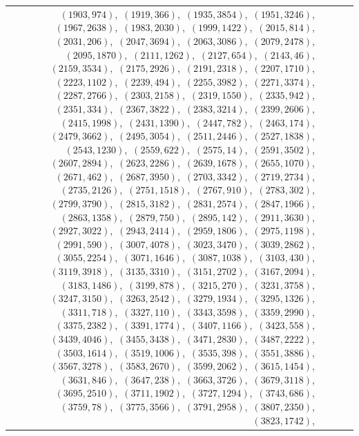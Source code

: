 \documentclass[11pt]{article}
\begin{document}
\begin{longtable}{@{}rrl>{\raggedright\arraybackslash}p{}@{}}
$(1903,974)$,\allowbreak\ $(1919,366)$,\allowbreak\ $(1935,3854)$,\allowbreak\ $(1951,3246)$,\allowbreak\ $(1967,2638)$,\allowbreak\ $(1983,2030)$,\allowbreak\ $(1999,1422)$,\allowbreak\ $(2015,814)$,\allowbreak\ $(2031,206)$,\allowbreak\ $(2047,3694)$,\allowbreak\ $(2063,3086)$,\allowbreak\ $(2079,2478)$,\allowbreak\ $(2095,1870)$,\allowbreak\ $(2111,1262)$,\allowbreak\ $(2127,654)$,\allowbreak\ $(2143,46)$,\allowbreak\ $(2159,3534)$,\allowbreak\ $(2175,2926)$,\allowbreak\ $(2191,2318)$,\allowbreak\ $(2207,1710)$,\allowbreak\ $(2223,1102)$,\allowbreak\ $(2239,494)$,\allowbreak\ $(2255,3982)$,\allowbreak\ $(2271,3374)$,\allowbreak\ $(2287,2766)$,\allowbreak\ $(2303,2158)$,\allowbreak\ $(2319,1550)$,\allowbreak\ $(2335,942)$,\allowbreak\ $(2351,334)$,\allowbreak\ $(2367,3822)$,\allowbreak\ $(2383,3214)$,\allowbreak\ $(2399,2606)$,\allowbreak\ $(2415,1998)$,\allowbreak\ $(2431,1390)$,\allowbreak\ $(2447,782)$,\allowbreak\ $(2463,174)$,\allowbreak\ $(2479,3662)$,\allowbreak\ $(2495,3054)$,\allowbreak\ $(2511,2446)$,\allowbreak\ $(2527,1838)$,\allowbreak\ $(2543,1230)$,\allowbreak\ $(2559,622)$,\allowbreak\ $(2575,14)$,\allowbreak\ $(2591,3502)$,\allowbreak\ $(2607,2894)$,\allowbreak\ $(2623,2286)$,\allowbreak\ $(2639,1678)$,\allowbreak\ $(2655,1070)$,\allowbreak\ $(2671,462)$,\allowbreak\ $(2687,3950)$,\allowbreak\ $(2703,3342)$,\allowbreak\ $(2719,2734)$,\allowbreak\ $(2735,2126)$,\allowbreak\ $(2751,1518)$,\allowbreak\ $(2767,910)$,\allowbreak\ $(2783,302)$,\allowbreak\ $(2799,3790)$,\allowbreak\ $(2815,3182)$,\allowbreak\ $(2831,2574)$,\allowbreak\ $(2847,1966)$,\allowbreak\ $(2863,1358)$,\allowbreak\ $(2879,750)$,\allowbreak\ $(2895,142)$,\allowbreak\ $(2911,3630)$,\allowbreak\ $(2927,3022)$,\allowbreak\ $(2943,2414)$,\allowbreak\ $(2959,1806)$,\allowbreak\ $(2975,1198)$,\allowbreak\ $(2991,590)$,\allowbreak\ $(3007,4078)$,\allowbreak\ $(3023,3470)$,\allowbreak\ $(3039,2862)$,\allowbreak\ $(3055,2254)$,\allowbreak\ $(3071,1646)$,\allowbreak\ $(3087,1038)$,\allowbreak\ $(3103,430)$,\allowbreak\ $(3119,3918)$,\allowbreak\ $(3135,3310)$,\allowbreak\ $(3151,2702)$,\allowbreak\ $(3167,2094)$,\allowbreak\ $(3183,1486)$,\allowbreak\ $(3199,878)$,\allowbreak\ $(3215,270)$,\allowbreak\ $(3231,3758)$,\allowbreak\ $(3247,3150)$,\allowbreak\ $(3263,2542)$,\allowbreak\ $(3279,1934)$,\allowbreak\ $(3295,1326)$,\allowbreak\ $(3311,718)$,\allowbreak\ $(3327,110)$,\allowbreak\ $(3343,3598)$,\allowbreak\ $(3359,2990)$,\allowbreak\ $(3375,2382)$,\allowbreak\ $(3391,1774)$,\allowbreak\ $(3407,1166)$,\allowbreak\ $(3423,558)$,\allowbreak\ $(3439,4046)$,\allowbreak\ $(3455,3438)$,\allowbreak\ $(3471,2830)$,\allowbreak\ $(3487,2222)$,\allowbreak\ $(3503,1614)$,\allowbreak\ $(3519,1006)$,\allowbreak\ $(3535,398)$,\allowbreak\ $(3551,3886)$,\allowbreak\ $(3567,3278)$,\allowbreak\ $(3583,2670)$,\allowbreak\ $(3599,2062)$,\allowbreak\ $(3615,1454)$,\allowbreak\ $(3631,846)$,\allowbreak\ $(3647,238)$,\allowbreak\ $(3663,3726)$,\allowbreak\ $(3679,3118)$,\allowbreak\ $(3695,2510)$,\allowbreak\ $(3711,1902)$,\allowbreak\ $(3727,1294)$,\allowbreak\ $(3743,686)$,\allowbreak\ $(3759,78)$,\allowbreak\ $(3775,3566)$,\allowbreak\ $(3791,2958)$,\allowbreak\ $(3807,2350)$,\allowbreak\ $(3823,1742)$,\allowbreak\ 
\end{longtable}
\end{document}
